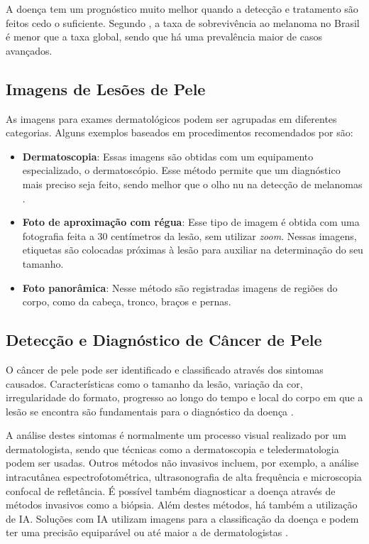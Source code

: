 A doença tem um prognóstico muito melhor quando a detecção e tratamento são feitos cedo o suficiente. Segundo \cite{skin_cancer_survival}, a taxa de sobrevivência ao
melanoma no Brasil é menor que a taxa global, sendo que há uma prevalência maior de casos avançados.

\subsection{Imagens de Lesões de Pele}

As imagens para exames dermatológicos podem ser agrupadas em diferentes categorias. Alguns exemplos baseados em procedimentos recomendados por \cite{fotos_dermatologia}
são:

\begin{itemize}
    \item \textbf{Dermatoscopia}: Essas imagens são obtidas com um equipamento especializado, o dermatoscópio. Esse método permite que um diagnóstico mais preciso seja
          feito, sendo melhor que o olho nu na detecção de melanomas \cite{dermatoscopy}.
    \item \textbf{Foto de aproximação com régua}: Esse tipo de imagem é obtida com uma fotografia feita a 30 centímetros da lesão, sem utilizar \textit{zoom}.
          Nessas imagens, etiquetas são colocadas próximas à lesão para auxiliar na determinação do seu tamanho.
    \item \textbf{Foto panorâmica}: Nesse método são registradas imagens de regiões do corpo, como da cabeça, tronco, braços e pernas.
\end{itemize}

\subsection{Detecção e Diagnóstico de Câncer de Pele}

O câncer de pele pode ser identificado e classificado através dos sintomas causados. Características como o tamanho da lesão, variação da cor, irregularidade do formato,
progresso ao longo do tempo e local do corpo em que a lesão se encontra são fundamentais para o diagnóstico da doença \cite{recognizing_skin_cancer}.

A análise destes sintomas é normalmente um processo visual realizado por um dermatologista, sendo que técnicas como a dermatoscopia e teledermatologia podem ser usadas.
Outros métodos não invasivos incluem, por exemplo, a análise intracutânea espectrofotométrica, ultrasonografia de alta frequência e microscopia confocal de refletância.
É possível também diagnosticar a doença através de métodos invasivos como a biópsia. Além destes métodos, há também a utilização de \ac{IA}. Soluções com \ac{IA}
utilizam imagens para a classificação da doença e podem ter uma precisão equiparável ou até maior a de dermatologistas \cite{recognizing_skin_cancer, skin_cancer_ai}.

